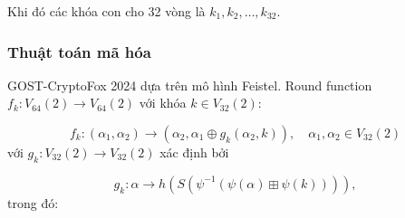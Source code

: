 Khi đó các khóa con cho 32 vòng là $k_1, k_2, \ldots, k_{32}$.

\subsubsection*{Thuật toán mã hóa}

GOST-CryptoFox 2024 dựa trên mô hình Feistel. Round function $f_k : V_{64}(2) \to V_{64}(2)$ với khóa $k \in V_{32}(2)$:

\begin{equation*}
    f_k : (\alpha_1, \alpha_2) \to (\alpha_2, \alpha_1 \oplus g_k (\alpha_2, k)), \quad \alpha_1, \alpha_2 \in V_{32}(2)
\end{equation*}
với $g_k : V_{32}(2) \to V_{32}(2)$ xác định bởi

\begin{equation*}
    g_k : \alpha \to h(S(\psi^{-1}(\psi(\alpha) \boxplus \psi(k)))),
\end{equation*}
trong đó:

